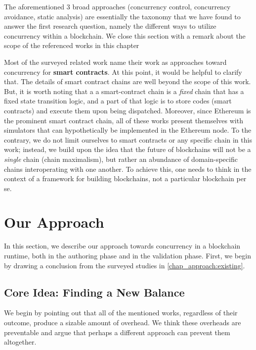 The aforementioned 3 broad approaches (concurrency control, concurrency avoidance, static analysis)
are essentially the taxonomy that we have found to answer the first research question, namely the
different ways to utilize concurrency within a blockchain. We close this section with a remark about
the scope of the referenced works in this chapter

\begin{remark}
    Most of the surveyed related work name their work as approaches toward concurrency for
    \textbf{smart contracts}. At this point, it would be helpful to clarify that. The details of
    smart contract chains are well beyond the scope of this work. But, it is worth noting that a a
    smart-contract chain is a \textit{fixed} chain that has a fixed state transition logic, and a
    part of that logic is to store codes (smart contracts) and execute them upon being dispatched.
    Moreover, since Ethereum is the prominent smart contract chain, all of these works present
    themselves with simulators that can hypothetically be implemented in the Ethereum node. To the
    contrary, we do not limit ourselves to smart contracts or any specific chain in this work;
    instead, we build upon the idea that the future of blockchains will not be a \textit{single}
    chain (chain maximalism), but rather an abundance of domain-specific chains interoperating with
    one another. To achieve this, one needs to think in the context of a framework for building
    blockchains, not a particular blockchain per se.
\end{remark}

\section{Our Approach} \label{chap_desgin:sec:our_approach}

In this section, we describe our approach towards concurrency in a blockchain runtime, both in the
authoring phase and in the validation phase. First, we begin by drawing a conclusion from the
surveyed studies in \ref{chap_approach:existing}.

\subsection{Core Idea: Finding a New Balance}

We begin by pointing out that all of the mentioned works, regardless of their outcome, produce a
sizable amount of overhead. We think these overheads are preventable and argue that perhaps a
different approach can prevent them altogether.

